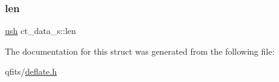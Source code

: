 \mbox{\label{structct__data__s_ad7f6929b2907e046dfbc8f091b494cfb}} 
\subsubsection{\texorpdfstring{len}{len}}
{\footnotesize\ttfamily \hyperlink{zutil_8h_a3754180d606d4ed15468d15d9665aa2e}{ush} ct\+\_\+data\+\_\+s\+::len}



The documentation for this struct was generated from the following file\+:\begin{DoxyCompactItemize}
\item 
qfits/\hyperlink{deflate_8h}{deflate.\+h}\end{DoxyCompactItemize}
